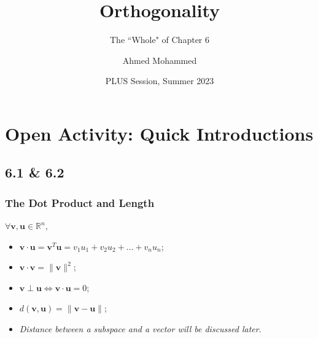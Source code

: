 \documentclass{beamer}
\title{Orthogonality}
\subtitle{The ``Whole" of Chapter 6}
\author{Ahmed Mohammed}
\institute{Georgia Institute of Technology}
\date{PLUS Session, Summer 2023}
\renewcommand{\vec}[1]{\mathbf{#1}}
\begin{document}
	\begin{frame}
		\maketitle
	\end{frame}

	\section{Open Activity: Quick Introductions}
	\subsection{6.1 \& 6.2}
	\begin{frame}
		\frametitle{The Dot Product and Length}
		\(\forall \vec{v}, \vec{u} \in \mathbb{R}^n,\)
		\begin{itemize}
			\item<2-> \(\vec{v} \cdot \vec{u} = \vec{v}^{T}\vec{u} = v_1u_1 + v_2u_2 + \dots + v_nu_n\);
			\item<3-> \(\vec{v} \cdot \vec{v} = \|\vec{v}\|^2\);
			\item<4-> \(\vec{v} \perp \vec{u} \iff \vec{v} \cdot \vec{u} = 0\);
			\item<5-> \(d(\vec{v}, \vec{u}) = \|\vec{v} - \vec{u}\|\);
			\item<6-> \textit{Distance between a subspace and a vector will be discussed later}.
		\end{itemize}
	\end{frame}
\end{document}
